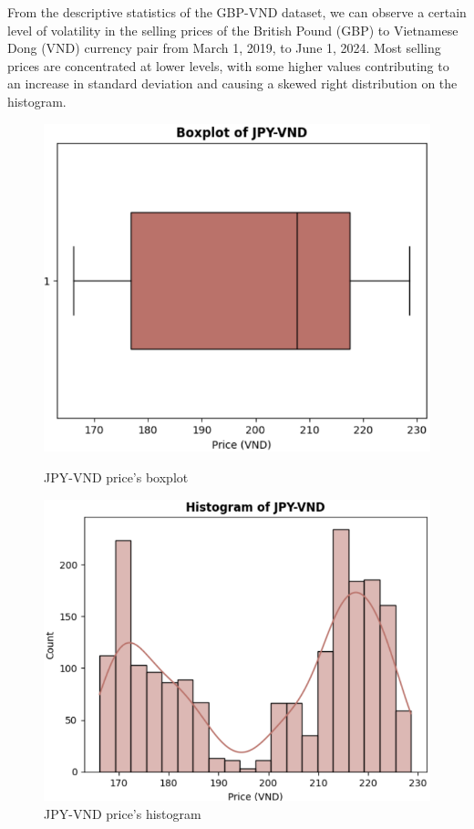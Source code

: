 \documentclass{ieeeojies}
\begin{document}
\justify
From the descriptive statistics of the GBP-VND dataset, we can observe a certain level of volatility in the selling prices of the British Pound (GBP) to Vietnamese Dong (VND) currency pair from March 1, 2019, to June 1, 2024. Most selling prices are concentrated at lower levels, with some higher values contributing to an increase in standard deviation and causing a skewed right distribution on the histogram. 
\begin{figure}[H]
    \centering
    \begin{minipage}{0.23\textwidth}
    \centering
    \includegraphics[width=1\textwidth]{Descriptive_statistic/jpy_boxplot.png}
    \caption{JPY-VND price's boxplot}
    \label{fig:1}
    \end{minipage}
    \hfill
    \begin{minipage}{0.23\textwidth}
    \centering
    \includegraphics[width=1\textwidth]{Descriptive_statistic/jpy_histogram.png}
    \caption{JPY-VND price's histogram}
    \label{fig:2}
    \end{minipage}
\end{figure}
\end{document}
